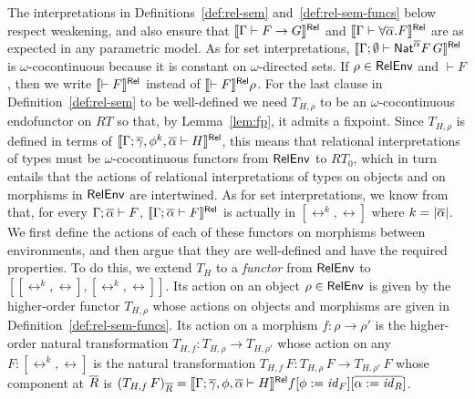 \documentclass{lmcs}
\theoremstyle{plain}\newtheorem{satz}[thm]{Satz}
\renewcommand{\id}{\mathit{id}}
\begin{document}
The interpretations in Definitions~\ref{def:rel-sem}
and~\ref{def:rel-sem-funcs} below respect weakening, and also ensure
that $\llbracket{\Gamma \vdash F \to G}\rrbracket^{\mathsf{Rel}}$ and $\llbracket{\Gamma \vdash
  \forall \overline{\alpha}. F}\rrbracket^{\mathsf{Rel}}$ are as expected in any parametric model.  As
for set interpretations, $\llbracket{\Gamma; \emptyset \vdash
  \mathsf{Nat}^{\overline{\alpha}} F\,G}\rrbracket^{\mathsf{Rel}}$ is $\omega$-cocontinuous because it is
constant on $\omega$-directed sets. If $\rho \in \mathsf{RelEnv}$ and $\vdash
F$, then we write $\llbracket{\vdash F}\rrbracket^{\mathsf{Rel}}$ instead of $\llbracket{\vdash
  F}\rrbracket^{\mathsf{Rel}}\rho$.  For the last clause in Definition~\ref{def:rel-sem} to be
well-defined we need $T_{H,\rho}$ to be an $\omega$-cocontinuous
endofunctor on $RT$ so that, by Lemma~\ref{lem:fp}, it admits a
fixpoint. Since $T_{H,\rho}$ is defined in terms of
$\llbracket{\Gamma;\overline{\gamma},\phi^k, \overline{\alpha} \vdash H}\rrbracket^{\mathsf{Rel}}$, this means
that relational interpretations of types must be $\omega$-cocontinuous
functors from $\mathsf{RelEnv}$ to $RT_0$, which in turn entails that the
actions of relational interpretations of types on objects and on
morphisms in $\mathsf{RelEnv}$ are intertwined. As for set interpretations, we
know from~\cite{jp19} that, for every $\Gamma; \overline{\alpha} \vdash F$,
$\llbracket{\Gamma; \overline{\alpha} \vdash F}\rrbracket^{\mathsf{Rel}}$ is actually in $[\rel^k,\rel]$
where $k = |\overline{\alpha}|$. We first define the actions of each of these
functors on morphisms between environments, and then argue that they
are well-defined and have the required properties. To do this, we
extend $T_H$ to a {\em functor} from $\mathsf{RelEnv}$ to
$[[\rel^k,\rel],[\rel^k,\rel]]$. Its action on an object $\rho \in
\mathsf{RelEnv}$ is given by the higher-order functor $T_{H,\rho}$ whose
actions on objects and morphisms are given in
Definition~\ref{def:rel-sem-funcs}. Its action on a morphism $f : \rho
\to \rho'$ is the higher-order natural transformation $T_{H,f} :
T_{H,\rho} \to T_{H,\rho'}$ whose action on any $F : [\rel^k,\rel]$ is
the natural transformation $T_{H,f}\, F : T_{H,\rho}\, F \to
T_{H,\rho'}\, F$ whose component at $\overline{R}$ is $(T_{H,f}\,
F)_{\ol{R}} = \relsem{\Gamma; \ol\gamma,\phi,\ol{\alpha} \vdash
  H}f[\phi := \id_F][\ol{\alpha := \id_R}]$.
\end{document}
